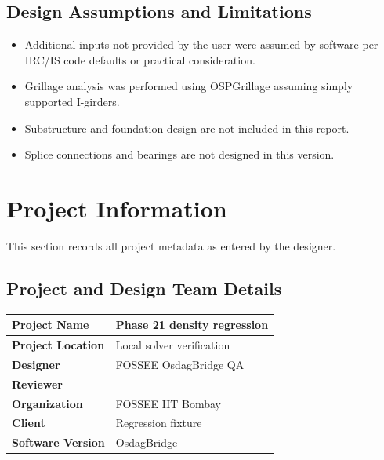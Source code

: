 \documentclass[12pt,a4paper]{report}
\numberwithin{table}{chapter}
\numberwithin{figure}{chapter}
\begin{document}
\section*{Design Assumptions and Limitations}
\label{sec:assumptions}

\begin{itemize}
\item Additional inputs not provided by the user were assumed by software per IRC/IS code defaults or practical consideration.
\item Grillage analysis was performed using OSPGrillage assuming simply supported I-girders.
\item Substructure and foundation design are not included in this report.
\item Splice connections and bearings are not designed in this version.
\end{itemize}

\titleformat{\chapter}[block]{\normalfont\Large\bfseries\centering}{\thechapter}{1em}{}
\titlespacing*{\chapter}{0pt}{-30pt}{10pt}


\chapter{Project Information}

This section records all project metadata as entered by the designer.

\section{Project and Design Team Details}
\label{sec:project-details}

\begin{tabular}{|L{5.5cm}|L{8.5cm}|}
\hline
\textbf{Project Name} & Phase 21 density regression \\
\hline
\textbf{Project Location} & Local solver verification \\
\hline
\textbf{Designer} & FOSSEE OsdagBridge QA \\
\hline
\textbf{Reviewer} &  \\
\hline
\textbf{Organization} & FOSSEE IIT Bombay \\
\hline
\textbf{Client} & Regression fixture \\
\hline
\textbf{Software Version} & OsdagBridge \\
\hline
\end{tabular}
\end{document}

